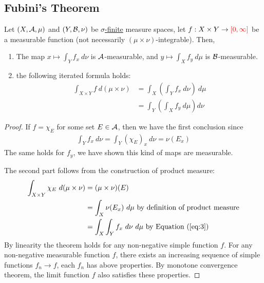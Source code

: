 \documentclass[11pt]{article}
\newcommand{\dmu}[0]{\ d\mu}
\begin{document}
	\subsection{Fubini's Theorem}
	\begin{theorem}
		Let $(X, \mathcal{{A}}, \mu)$ and $(Y, \mathcal{{B}}, \nu)$ be \ul{$\sigma$-finite} measure spaces, let $f: X \times Y \to \textcolor{red}{[0, \infty]}$ be a measurable function (not necessarily $(\mu \times \nu)$-integrable). Then,
		\begin{enumerate}
			\item The map $x \mapsto \int_Y f_x\ d\nu$ is $\mathcal{{A}}$-measurable, and $y \mapsto \int_X f_y\ d\mu$ is $\mathcal{{B}}$-measurable.
			\item the following iterated formula holds:
			\begin{align}
				\int_{X \times Y} f\ d(\mu \times \nu)
				&= \int_X \left(\int_Y f_x\ d\nu \right)\dmu \\
				&= \int_Y \left(\int_X f_y\dmu \right)d\nu
			\end{align}
		\end{enumerate}
		\begin{proof}
			If $f = \chi_E$ for some set $E \in \mathcal{{A}}$, then we have the first conclusion since
			\begin{align}
				\int_Y f_x\ d\nu = \int_Y (\chi_E)_x\ d\nu = \nu(E_x) \label{eq:3}
			\end{align}
			The same holds for $f_y$, we have shown this kind of maps are measurable.
			
			The second part follows from the construction of product measure:
			\begin{align}
				\int_{X \times Y} \chi_E\ d(\mu \times \nu) &= (\mu \times \nu)(E) \\
				&= \int_X \nu(E_x)\dmu \tx{ by definition of product measure}\\
				&= \int_X \int_Y f_x\ d\nu\dmu \tx{ by Equation (\ref{eq:3})}
			\end{align}
			By linearity the theorem holds for any non-negative simple function $f$.
			For any non-negative measurable function $f$, there exists an increasing sequence of simple functions $f_n \to f$, each $f_n$ has above properties. 
			By monotone convergence theorem, the limit function $f$ also satisfies these properties.
		\end{proof}
	\end{theorem}
	
\end{document}
